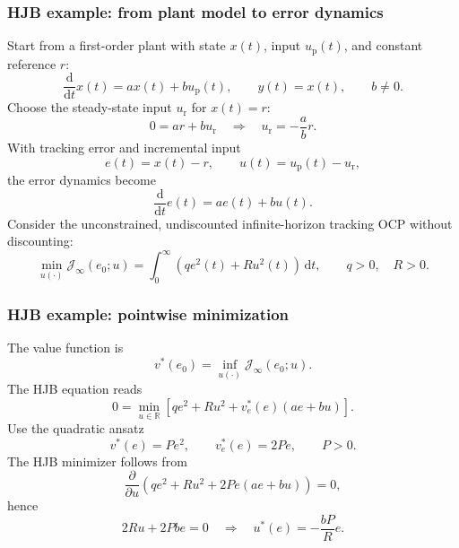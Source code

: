 \begin{frame}
	\frametitle{HJB example: from plant model to error dynamics}
	Start from a first-order plant with state $x(t)$, input $u_{\mathrm{p}}(t)$, and constant reference $r$:
	\begin{equation*}
		\frac{\mathrm{d}}{\mathrm{d}t}x(t)=a x(t)+b u_{\mathrm{p}}(t),
		\qquad y(t)=x(t),
		\qquad b\neq0 .
	\end{equation*}\pause%
	Choose the steady-state input $u_{\mathrm{r}}$ for $x(t)=r$:
	\begin{equation*}
		0=a r+b u_{\mathrm{r}}
		\quad\Rightarrow\quad
		u_{\mathrm{r}}=-\frac{a}{b}r .
	\end{equation*}\pause%
	With tracking error and incremental input
	\begin{equation*}
		e(t)=x(t)-r,
		\qquad
		u(t)=u_{\mathrm{p}}(t)-u_{\mathrm{r}},
	\end{equation*}\pause%
	the error dynamics become
	\begin{equation*}
		\boxed{\frac{\mathrm{d}}{\mathrm{d}t}e(t)=a e(t)+b u(t).}
	\end{equation*}\pause%
	Consider the unconstrained, undiscounted infinite-horizon tracking OCP without discounting:
	\begin{equation*}
		\min_{u(\cdot)}\mathcal{J}_\infty(e_0;u)
		=\int_0^\infty \left(q e^2(t)+R u^2(t)\right)\,\mathrm{d}t,
		\qquad q>0,
		\quad R>0 .
	\end{equation*}
\end{frame}

\begin{frame}
	\frametitle{HJB example: pointwise minimization}
	The value function is
	\begin{equation*}
		v^*(e_0)=\inf_{u(\cdot)}\mathcal{J}_\infty(e_0;u) .
	\end{equation*}\pause%
	The HJB equation reads
	\begin{equation*}
		0=\min_{u\in\mathbb{R}}
		\left[q e^2+R u^2+v_e^*(e)(a e+b u)\right] .
	\end{equation*}\pause%
	Use the quadratic ansatz
	\begin{equation*}
		v^*(e)=P e^2,
		\qquad v_e^*(e)=2Pe,
		\qquad P>0 .
	\end{equation*}\pause%
	The HJB minimizer follows from
	\begin{equation*}
		\frac{\partial}{\partial u}
		\left(q e^2+R u^2+2Pe(ae+bu)\right)=0,
	\end{equation*}\pause%
	hence
	\begin{equation*}
		2Ru+2Pbe=0
		\quad\Rightarrow\quad
		\boxed{u^*(e)=-\frac{bP}{R}e.}
	\end{equation*}
\end{frame}

